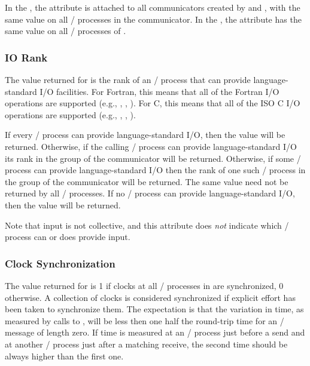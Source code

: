 In the \spm{}, the attribute  is attached to
all communicators created by  and\flushline
{},
with the same value on all \MPI/ processes in the communicator.
In the \wpm{},
the attribute  has the same value on all \mpi/ processes
of .


\subsubsection{IO Rank}
The value returned for  is the rank of an \mpi/ process that can
provide language-standard I/O facilities.  For Fortran, this means that all of
the Fortran I/O operations are supported (e.g., , ,
).  For C, 
this means that all of the 
ISO C
I/O operations are
supported (e.g., , , ).

If every \mpi/ process can provide language-standard I/O, then the value
 will be returned.  Otherwise, if the calling
\mpi/ process can provide language-standard I/O its rank in the group of the communicator will be
returned.  Otherwise, if some \mpi/ process can provide language-standard
I/O then the rank of one such \mpi/ process in the group of the communicator will be returned. The same value
need not be returned by all \mpi/ processes.
If no \mpi/ process can provide
language-standard I/O, then the value
 will be  %
returned.

\begin{users}
Note that input is not collective, and this attribute does \emph{not} indicate
which \mpi/ process can or does provide input.
\end{users}

\subsubsection{Clock Synchronization}
\label{subsubsec:inquiry-clock-sync}

The value returned for  is 1 if clocks
at all \mpi/ processes in\flushline %
 are synchronized, 0
otherwise.  A collection of clocks is considered synchronized if
explicit effort has been taken to synchronize them.  The
expectation is that the variation in time, as measured by calls
to , will be less then one half the round-trip
time for an \MPI/ message of length zero.  If time is measured at an \mpi/
process just before a send and at another \mpi/ process just after a matching
receive, the second time should be always higher than the first one.

